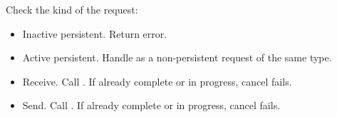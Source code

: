 \documentclass{article}
\begin{document}
\subsubsection{}
Check the kind of the request:
\begin{itemize}
\item Inactive persistent.  Return error.
\item Active persistent.  Handle as a non-persistent request of the same type.
\item Receive.  Call .  If already complete
or in progress, cancel fails.   


\item Send. Call .  If already complete or
in progress, cancel fails. 




\end{itemize}
\end{document}
